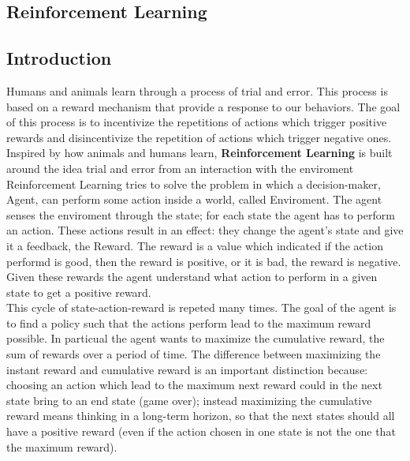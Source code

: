 \documentclass[14pt]{extarticle}
\def\sp{\vspace{5pt}}
\def\pp{\vspace{10pt}\newline}
\begin{document}
\newpage
\begin{center}
	\section{Reinforcement Learning}
\end{center}

\subsection{Introduction}
\sp
\begin{flushleft}
Humans and animals learn through a process of trial and error. This process is based on a reward mechanism that provide a response to our behaviors. The goal of this process is to incentivize the repetitions of actions which trigger positive rewards and disincentivize the repetition of actions which trigger negative ones.
\\
Inspired by how animals and humans learn, \textbf{Reinforcement Learning} is built around the idea trial and error from an interaction with the enviroment 
\pp
Reinforcement Learning tries to solve the problem in which a decision-maker, Agent, can perform some action inside a world, called Enviroment. The agent senses the enviroment through the state; for each state the agent has to perform an action. These actions result in an effect: they change the agent's state and give it a feedback, the Reward. The reward is a value which indicated if the action performd is good, then the reward is positive, or it is bad, the reward is negative. Given these rewards the agent understand what action to perform in a given state to get a positive reward. 
\\
This cycle of state-action-reward is repeted many times. The goal of the agent is to find a policy such that the actions perform lead to the maximum reward possible. In particual the agent wants to maximize the cumulative reward, the sum of rewards over a period of time. The difference between maximizing the instant reward and cumulative reward is an important distinction because: choosing an action which lead to the maximum next reward could in the next state bring to an end state (game over); instead maximizing the cumulative reward means thinking in a long-term horizon, so that the next states should all have a positive reward (even if the action chosen in one state is not the one that the
maximum reward).


\end{flushleft}
\end{document}
